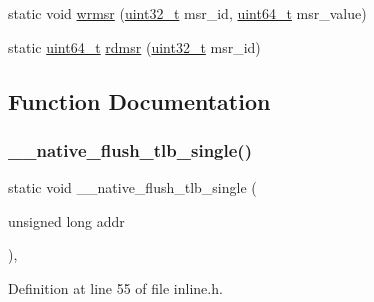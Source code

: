 \begin{DoxyCompactItemize}
static void \hyperlink{a00104_a368f08346121290f513a26011e0f68f8_a368f08346121290f513a26011e0f68f8}{wrmsr} (\hyperlink{a00092_a435d1572bf3f880d55459d9805097f62_a435d1572bf3f880d55459d9805097f62}{uint32\+\_\+t} msr\+\_\+id, \hyperlink{a00092_aa232ecf786a74ce5363c36c10798d2b1_aa232ecf786a74ce5363c36c10798d2b1}{uint64\+\_\+t} msr\+\_\+value)
\item 
static \hyperlink{a00092_aa232ecf786a74ce5363c36c10798d2b1_aa232ecf786a74ce5363c36c10798d2b1}{uint64\+\_\+t} \hyperlink{a00104_a6fa28502e33e305c4335fe3032dc7799_a6fa28502e33e305c4335fe3032dc7799}{rdmsr} (\hyperlink{a00092_a435d1572bf3f880d55459d9805097f62_a435d1572bf3f880d55459d9805097f62}{uint32\+\_\+t} msr\+\_\+id)
\end{DoxyCompactItemize}


\subsection{Function Documentation}
\mbox{\label{a00104_ad80d786594a109b21e30da4bf6f56a85_ad80d786594a109b21e30da4bf6f56a85}} 
\subsubsection{\texorpdfstring{\+\_\+\+\_\+native\+\_\+flush\+\_\+tlb\+\_\+single()}{\_\_native\_flush\_tlb\_single()}}
{\footnotesize\ttfamily static void \+\_\+\+\_\+native\+\_\+flush\+\_\+tlb\+\_\+single (\begin{DoxyParamCaption}\item[{unsigned long}]{addr }\end{DoxyParamCaption})\hspace{0.3cm}{\ttfamily [inline]}, {\ttfamily [static]}}



Definition at line 55 of file inline.\+h.


\mbox{\label{a00104_ae7df27a6150c6a020eead928af349b21_ae7df27a6150c6a020eead928af349b21}} 
